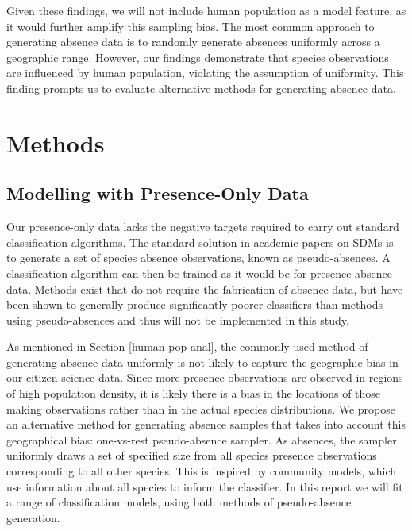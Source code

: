\documentclass{article}
\begin{document}
Given these findings, we will not include human population as a model feature, as it would further amplify this sampling bias. The most common approach to generating absence data is to randomly generate absences uniformly across a geographic range. However, our findings demonstrate that species observations are influenced by human population, violating the assumption of uniformity. This finding prompts us to evaluate alternative methods for generating absence data.\vspace{-0.4em}

\section{Methods}\vspace{-0.4em}
\subsection{Modelling with Presence-Only Data}\vspace{-0.5em}


Our presence-only data lacks the negative targets required to carry out standard classification algorithms. The standard solution in academic papers on SDMs is to generate a set of species absence observations, known as pseudo-absences. A classification algorithm can then be trained as it would be for presence-absence data. Methods exist that do not require the fabrication of absence data, but have been shown to generally produce significantly poorer classifiers than methods using pseudo-absences \cite{Elith_2006} and thus will not be implemented in this study.

As mentioned in Section \ref{human pop anal}, the commonly-used method of generating absence data uniformly is not likely to capture the geographic bias in our citizen science data. Since more presence observations are observed in regions of high population density, it is likely there is a bias in the locations of those making observations rather than in the actual species distributions. We propose an alternative method for generating absence samples that takes into account this geographical bias: one-vs-rest pseudo-absence sampler. As absences, the sampler uniformly draws a set of specified size from all species presence observations corresponding to all other species. This is inspired by community models, which use information about all species to inform the classifier. In this report we will fit a range of classification models, using both methods of pseudo-absence generation. \vspace{-0.4em}
\end{document}
